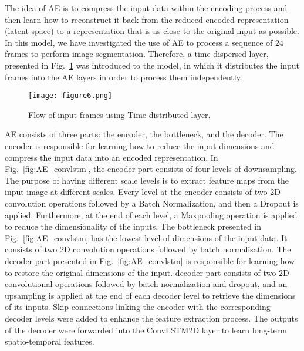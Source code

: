 \begin{sloppypar}
	\DIFaddend The idea of AE is to compress the input data within the encoding process and then learn how to reconstruct it back from the reduced encoded representation (latent space) to a representation that is as close to the original input as possible. 
	In this model, we have investigated the use of AE to process a sequence of \(24\) frames to perform image segmentation.
	Therefore, a time-dispersed layer, presented in Fig.~\ref{fig:TD} was introduced to the model, in which it distributes the input frames into the AE layers in order to process them independently.
	\begin{figure}[!ht]
		\centering
		\texttt{[image: figure6.png]}
		\caption{Flow of input frames using Time-distributed layer.}
		\label{fig:TD}
	\end{figure}

	\DIFdelbegin {}\DIFdelend \DIFaddbegin {}\DIFaddend AE consists of three parts: the encoder, the bottleneck, and the decoder.
	The encoder is responsible for learning how to reduce the input dimensions and compress the input data into an encoded representation.
	In Fig.~\ref{fig:AE_convlstm}, the encoder part consists of four levels of downsampling. 
	The purpose of having different scale levels is to extract feature maps from the input image at different scales.
	Every level at the encoder consists of two 2D convolution operations followed by a Batch Normalization, and then a Dropout is applied.
	Furthermore, at the end of each level, a Maxpooling operation is applied to reduce the dimensionality of the inputs. 
	The bottleneck presented in Fig.~\ref{fig:AE_convlstm} has the lowest level of dimensions of the input data.
	It consists of two 2D convolution operations followed by batch normalisation.
	The decoder part presented in Fig.~\ref{fig:AE_convlstm} is responsible for learning how to restore the original dimensions of the input.
	\DIFdelbegin {}\DIFdelend \DIFaddbegin {}\DIFaddend decoder part consists of two 2D convolutional operations followed by batch normalization and dropout, and an upsampling is applied at the end of each decoder level to retrieve the dimensions of its inputs.
	Skip connections linking the encoder with the corresponding decoder levels were added to enhance the feature extraction process.
	The outputs of the decoder were forwarded into the ConvLSTM2D layer to learn long-term spatio-temporal features.


\end{sloppypar}
